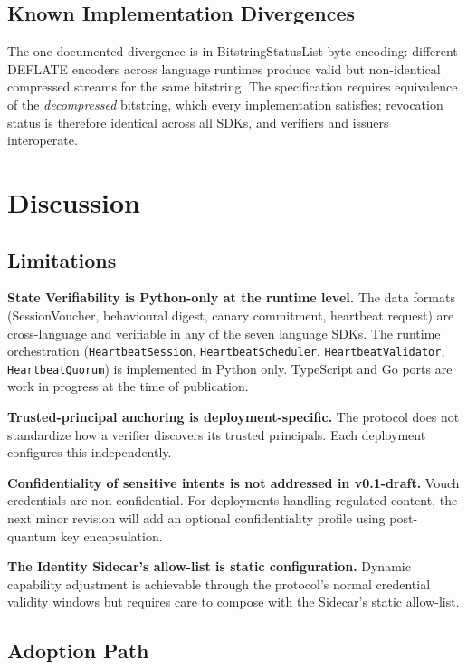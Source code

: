 \documentclass[11pt,a4paper]{article}
\begin{document}
\subsection{Known Implementation Divergences}

The one documented divergence is in BitstringStatusList byte-encoding: different DEFLATE encoders across language runtimes produce valid but non-identical compressed streams for the same bitstring. The specification requires equivalence of the \emph{decompressed} bitstring, which every implementation satisfies; revocation status is therefore identical across all SDKs, and verifiers and issuers interoperate.

\section{Discussion}
\label{sec:discussion}

\subsection{Limitations}

\noindent\textbf{State Verifiability is Python-only at the runtime level.} The data formats (SessionVoucher, behavioural digest, canary commitment, heartbeat request) are cross-language and verifiable in any of the seven language SDKs. The runtime orchestration (\verb|HeartbeatSession|, \verb|HeartbeatScheduler|, \verb|HeartbeatValidator|, \verb|HeartbeatQuorum|) is implemented in Python only. TypeScript and Go ports are work in progress at the time of publication.

\noindent\textbf{Trusted-principal anchoring is deployment-specific.} The protocol does not standardize how a verifier discovers its trusted principals. Each deployment configures this independently.

\noindent\textbf{Confidentiality of sensitive intents is not addressed in v0.1-draft.} Vouch credentials are non-confidential. For deployments handling regulated content, the next minor revision will add an optional confidentiality profile using post-quantum key encapsulation.

\noindent\textbf{The Identity Sidecar's allow-list is static configuration.} Dynamic capability adjustment is achievable through the protocol's normal credential validity windows but requires care to compose with the Sidecar's static allow-list.

\subsection{Adoption Path}
\end{document}
